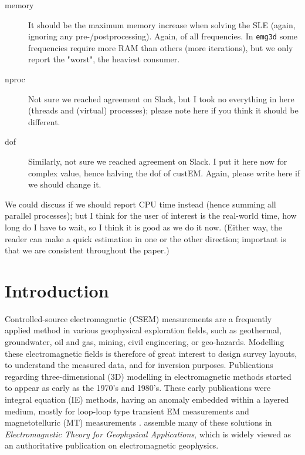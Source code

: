 \documentclass[
    paper,
  ]{geophysics}
\newcommand{\emg}[2]{\texttt{emg#1#2}\xspace}
\newcommand{\itodo}[1]{\todo[inline]{\sffamily #1}}
\begin{document}
\begin{itemize}
\begin{description}
        \item[memory] It should be the maximum memory increase when solving the SLE (again, ignoring any pre-/postprocessing). Again, of all frequencies. In \emg3d some frequencies require more RAM than others (more iterations), but we only report the "worst", the heaviest consumer.
        \item[nproc] Not sure we reached agreement on Slack, but I took no everything in here (threads and (virtual) processes); please note here if you think it should be different.
        \item[dof] Similarly, not sure we reached agreement on Slack. I put it here now for complex value, hence halving the dof of custEM. Again, please write here if we should change it.
    \end{description}
    We could discuss if we should report CPU time instead (hence summing all parallel processes); but I think for the user of interest is the real-world time, how long do I have to wait, so I think it is good as we do it now. (Either way, the reader can make a quick estimation in one or the other direction; important is that we are consistent throughout the paper.)
\end{itemize}
\itodo{\hfill$\Uparrow$\hfill$\Uparrow$\hfill List of things ToDo, Notes, etc\hfill$\Uparrow$\hfill$\Uparrow$\hfill~}
\newpage

\section{Introduction}

Controlled-source electromagnetic (CSEM) measurements are a frequently applied method in various geophysical exploration fields, such as geothermal, groundwater, oil and gas, mining, civil engineering, or geo-hazards. Modelling these electromagnetic fields is therefore of great interest to design survey layouts, to understand the measured data, and for inversion purposes. Publications regarding three-dimensional (3D) modelling in electromagnetic methods started to appear as early as the 1970's and 1980's. These early publications were integral equation (IE) methods, having an anomaly embedded within a layered medium, mostly for loop-loop type transient EM measurements \citep{GJI.74.Raiche, GEO.75.Hohmann, GJI.82.Das, GEO.86.Newman} and magnetotelluric (MT) measurements \citep{GEO.84.Wannamaker}. \cite{B.SEG.88.Ward} assemble many of these solutions in \emph{Electromagnetic Theory for Geophysical Applications}, which is widely viewed as an authoritative publication on electromagnetic geophysics.
\end{document}
